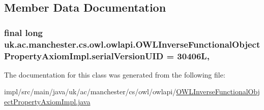 \subsection{Member Data Documentation}
\hypertarget{classuk_1_1ac_1_1manchester_1_1cs_1_1owl_1_1owlapi_1_1_o_w_l_inverse_functional_object_property_axiom_impl_a843852c8626880d12874da5193b771c5}{
\subsubsection[{serial\-Version\-U\-I\-D}]{\setlength{\rightskip}{0pt plus 5cm}final long uk.\-ac.\-manchester.\-cs.\-owl.\-owlapi.\-O\-W\-L\-Inverse\-Functional\-Object\-Property\-Axiom\-Impl.\-serial\-Version\-U\-I\-D = 30406\-L\hspace{0.3cm}{\ttfamily [static]}, {\ttfamily [private]}}}\label{classuk_1_1ac_1_1manchester_1_1cs_1_1owl_1_1owlapi_1_1_o_w_l_inverse_functional_object_property_axiom_impl_a843852c8626880d12874da5193b771c5}


The documentation for this class was generated from the following file\-:\begin{DoxyCompactItemize}
\item 
impl/src/main/java/uk/ac/manchester/cs/owl/owlapi/\hyperlink{_o_w_l_inverse_functional_object_property_axiom_impl_8java}{O\-W\-L\-Inverse\-Functional\-Object\-Property\-Axiom\-Impl.\-java}\end{DoxyCompactItemize}
